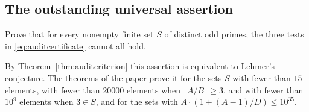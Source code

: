 \subsection{The outstanding universal assertion}
\begin{problem}\label{prob:universalprime}
Prove that for every nonempty finite set $S$ of distinct odd primes,
the three tests in \eqref{eq:auditcertificate} cannot all hold.
\end{problem}
By Theorem~\ref{thm:auditcriterion} this assertion is equivalent to
Lehmer's conjecture. The theorems of the paper prove it for the sets
$S$ with fewer than $15$ elements, with fewer than $20000$ elements
when $\lceil A/B\rceil\ge3$, and with fewer than $10^9$ elements when
$3\in S$, and for the sets with $A\cdot(1+(A-1)/D)\le10^{35}$.
